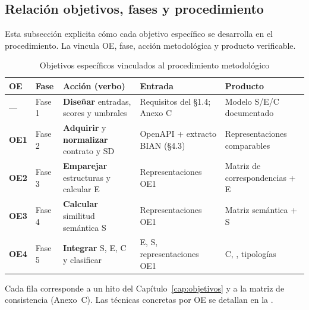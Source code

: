 \subsection{Relación objetivos, fases y procedimiento}
\label{sec:objetivos-metodologia}

Esta subsección explicita cómo cada objetivo específico se desarrolla en el procedimiento. La
 vincula OE, fase, acción metodológica y producto verificable.

\begin{table}[H]
  \centering
  \caption{Objetivos específicos vinculados al procedimiento metodológico}
  \label{tab:oe-metodologia}
  \small
  \begin{tabular}{@{}p{}p{}p{}p{}p{}@{}}
    \toprule
    \textbf{OE} & \textbf{Fase} & \textbf{Acción (verbo)} & \textbf{Entrada} & \textbf{Producto} \\
    \midrule
    --- &
    Fase 1 &
    \textbf{Diseñar} entradas, scores y umbrales &
    Requisitos del §1.4; Anexo C &
    Modelo S/E/C documentado \\
    \textbf{OE1} &
    Fase 2 &
    \textbf{Adquirir} y \textbf{normalizar} contrato y SD &
    OpenAPI + extracto BIAN (§4.3) &
    Representaciones comparables \\
    \textbf{OE2} &
    Fase 3 &
    \textbf{Emparejar} estructuras y calcular E &
    Representaciones OE1 &
    Matriz de correspondencias + E \\
    \textbf{OE3} &
    Fase 4 &
    \textbf{Calcular} similitud semántica S &
    Representaciones OE1 &
    Matriz semántica + S \\
    \textbf{OE4} &
    Fase 5 &
    \textbf{Integrar} S, E, C y clasificar &
    E, S, representaciones OE1 &
    C, \AlignmentScore{}, tipologías \\
    \bottomrule
  \end{tabular}
\end{table}

Cada fila corresponde a un hito del Capítulo~\ref{cap:objetivos} y a la matriz de consistencia
(Anexo~C). Las técnicas concretas por OE se detallan en la .
